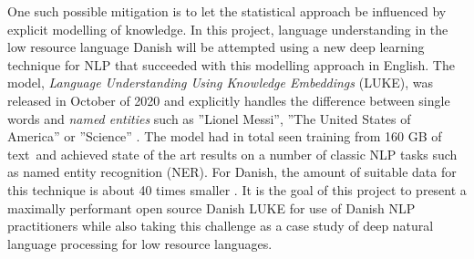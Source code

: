 \documentclass[main.tex]{subfiles}
\begin{document}
One such possible mitigation is to let the statistical approach be influenced by explicit modelling of knowledge.
In this project, language understanding in the low resource language Danish will be attempted using a new deep learning technique for NLP that succeeded with this modelling approach in English.
The model, \emph{Language Understanding Using Knowledge Embeddings} (LUKE), was released in October of 2020 and explicitly handles the difference between single words and \emph{named entities} such as ''Lionel Messi'', ''The United States of America'' or ''Science'' \cite{yamada2020luke}.
The model had in total seen training from 160 GB of text\footnotemark~and achieved state of the art results on a number of classic NLP tasks such as named entity recognition (NER).
For Danish, the amount of suitable data for this technique is about 40 times smaller \footnotemark.
It is the goal of this project to present a maximally performant open source Danish LUKE for use of Danish NLP practitioners while also taking this challenge as a case study of deep natural language processing for low resource languages.
\end{document}
